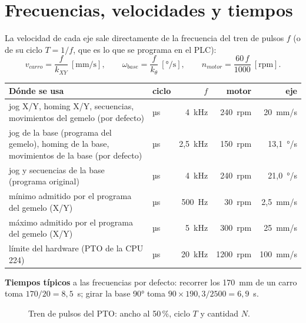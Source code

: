 \section{Frecuencias, velocidades y tiempos}
La velocidad de cada eje sale directamente de la frecuencia del tren de pulsos $f$ (o de su ciclo $T = 1/f$, que es lo que se programa en el PLC):
\[
v_{carro} = \frac{f}{k_{XY}}~[\text{mm/s}], \qquad \omega_{base} = \frac{f}{k_\theta}~[\text{°/s}], \qquad n_{motor} = \frac{60\,f}{1000}~[\text{rpm}] .
\]

\begin{center}\small
\begin{longtable}{>{\raggedright}p{4.6cm} >{\ttfamily}p{1.6cm} r r r}
\toprule
\textbf{Dónde se usa} & \textbf{\rmfamily ciclo} & \textbf{$f$} & \textbf{motor} & \textbf{eje}\\
\midrule
\endhead
jog X/Y, homing X/Y, secuencias, movimientos del gemelo (por defecto) & 250 µs & 4~kHz & 240~rpm & 20~mm/s\\
jog de la base (programa del gemelo), homing de la base, movimientos de la base (por defecto) & 400 µs & 2,5~kHz & 150~rpm & 13,1~°/s\\
jog y secuencias de la base (programa original) & 250 µs & 4~kHz & 240~rpm & 21,0~°/s\\
mínimo admitido por el programa del gemelo (X/Y) & 2000 µs & 500~Hz & 30~rpm & 2,5~mm/s\\
máximo admitido por el programa del gemelo (X/Y) & 200 µs & 5~kHz & 300~rpm & 25~mm/s\\
límite del hardware (PTO de la CPU 224) & 50 µs & 20~kHz & 1200~rpm & 100~mm/s\\
\bottomrule
\end{longtable}
\end{center}

\textbf{Tiempos típicos} a las frecuencias por defecto: recorrer los 170~mm de un carro toma $170/20 = 8{,}5$~s; girar la base 90° toma $90 \times 190{,}3 / 2500 = 6{,}9$~s.

\begin{figure}[H]
\centering
{}
\caption{Tren de pulsos del PTO: ancho al 50\,\%, ciclo $T$ y cantidad $N$.}
\end{figure}

